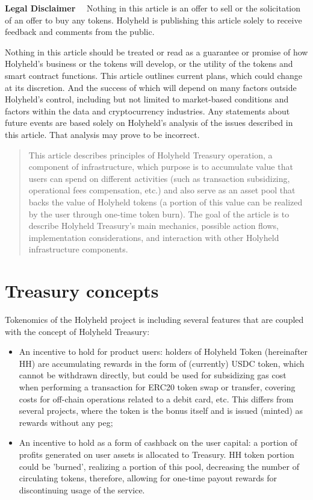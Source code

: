 \documentclass[12pt]{article}
\begin{document}
\maketitle

\textbf{\footnotesize Legal Disclaimer}\scriptsize
~~Nothing in this article is an offer to sell or the solicitation of an offer to buy any tokens. Holyheld is publishing this article solely to receive feedback and comments from the public.

Nothing in this article should be treated or read as a guarantee or promise of how Holyheld’s business or the tokens will develop, or the utility of the tokens and smart contract functions. This article outlines current plans, which could change at its discretion. And the success of which will depend on many factors outside Holyheld’s control, including but not limited to market-based conditions and factors within the data and cryptocurrency industries. Any statements about future events are based solely on Holyheld’s analysis of the issues described in this article. That analysis may prove to be incorrect.

\begin{abstract}
This article describes principles of Holyheld Treasury operation, a component of infrastructure, which purpose is to accumulate value that users can spend on different activities (such as transaction subsidizing, operational fees compensation, etc.) and also serve as an asset pool that backs the value of Holyheld tokens (a portion of this value can be realized by the user through one-time token burn). The goal of the article is to describe Holyheld Treasury's main mechanics, possible action flows, implementation considerations, and interaction with other Holyheld infrastructure components.
\end{abstract}


\section{Treasury concepts}\normalsize

Tokenomics of the Holyheld project \cite{holyheld2021} is including several features that are coupled with the concept of Holyheld Treasury:
\begin{itemize}
\item An incentive to hold for product users: holders of Holyheld Token (hereinafter HH) are accumulating rewards in the form of (currently) USDC token, which cannot be withdrawn directly, but could be used for subsidizing gas cost when performing a transaction for ERC20 token swap or transfer, covering costs for off-chain operations related to a debit card, etc. This differs from several projects, where the token is the bonus itself and is issued (minted) as rewards without any peg;
\item An incentive to hold as a form of cashback on the user capital: a portion of profits generated on user assets is allocated to Treasury. HH token portion could be 'burned', realizing a portion of this pool, decreasing the number of circulating tokens, therefore, allowing for one-time payout rewards for discontinuing usage of the service.
\end{itemize}
\end{document}
